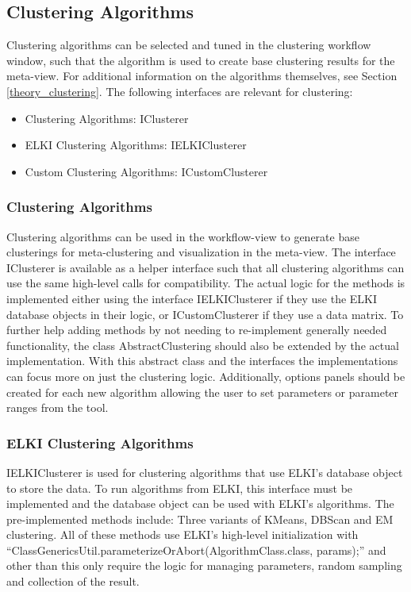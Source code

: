 \documentclass[
	a4paper,
	english,
	twoside,
	openright,               
	11pt                            
	]{report}
\begin{document}
\subsection{Clustering Algorithms}
Clustering algorithms can be selected and tuned in the clustering workflow window, such that the algorithm is used to create base clustering results for the meta-view. For additional information on the algorithms themselves, see Section \ref{theory_clustering}. The following interfaces are relevant for clustering:

\begin{itemize}
  \item Clustering Algorithms: IClusterer
  \item ELKI Clustering Algorithms: IELKIClusterer
  \item Custom Clustering Algorithms: ICustomClusterer
\end{itemize}

\subsubsection{Clustering Algorithms}
Clustering algorithms can be used in the workflow-view to generate base clusterings for meta-clustering and visualization in the meta-view. The interface IClusterer is available as a helper interface such that all clustering algorithms can use the same high-level calls for compatibility. The actual logic for the methods is implemented either using the interface IELKIClusterer if they use the ELKI database objects in their logic, or ICustomClusterer if they use a data matrix. To further help adding methods by not needing to re-implement generally needed functionality, the class AbstractClustering should also be extended by the actual implementation. With this abstract class and the interfaces the implementations can focus more on just the clustering logic. Additionally, options panels should be created for each new algorithm allowing the user to set parameters or parameter ranges from the tool.

\subsubsection{ELKI Clustering Algorithms}
IELKIClusterer is used for clustering algorithms that use ELKI's database object to store the data. To run algorithms from ELKI, this interface must be implemented and the database object can be used with ELKI's algorithms. The pre-implemented methods include: Three variants of KMeans, DBScan and EM clustering. All of these methods use ELKI's high-level initialization with ``ClassGenericsUtil.parameterizeOrAbort(AlgorithmClass.class, params);'' and other than this only require the logic for managing parameters, random sampling and collection of the result.
\end{document}
